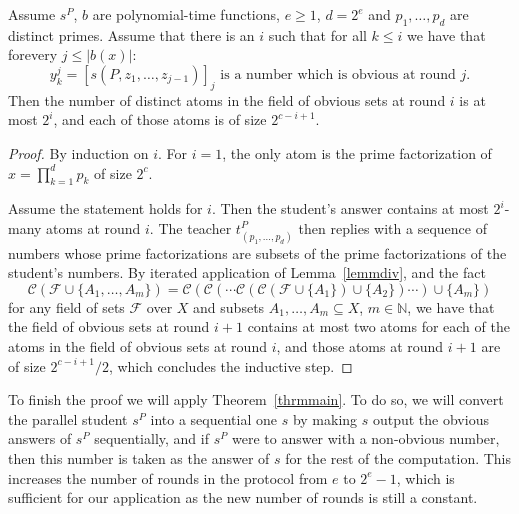 \documentclass{lmcs}
\newcommand{\abs}[1]{\lvert #1\rvert}
\newcommand{\F}{\mathcal{F}}
\newcommand{\C}{\mathcal{C}}
\newcommand{\NN}{\mathbb{N}}
\begin{document}
\begin{lem}\label{lemmatoms}
    Assume $s^P$, $b$ are polynomial-time functions, ${e}\geq 1$, $d=2^{{e}}$ and $p_1,\dots,p_d$ are distinct primes. Assume that there is an $i$ such that for all $k\leq i$ we have that for\linebreak every $j\leq \abs{b(x)}$: 
    \[y_k^j=[s(P,z_1,\dots,z_{j-1})]_j\text{ is a number which is obvious at round $j$.}\] 
    Then the number of distinct atoms in the field of obvious sets at round $i$ is at most $2^i$, and each of those atoms is of size $2^{c-i+1}$.
\end{lem}
\begin{proof}
    By induction on $i$. For $i=1$, the only atom is the prime factorization of $x=\prod^d_{k=1} p_k$ of size $2^{c}$.

    Assume the statement holds for $i$. Then the student's answer contains at most $2^i$-many atoms at round $i$. The teacher $t^P_{(p_1,\dots,p_d)}$ then replies with a sequence of numbers whose prime factorizations are subsets of the prime factorizations of the student's numbers. By iterated application of Lemma~\ref{lemmdiv}, and the fact 
    \[\C(\F \cup \{A_1,\dots,A_m\})=\C(\C(\cdots \C(\C(\F \cup \{A_1\})\cup \{A_2\}) \cdots )\cup \{A_m\})\]
    for any field of sets $\F$ over $X$ and subsets $A_1,\dots,A_m \subseteq X$, $m\in \NN$, we have that the field of obvious sets at round $i+1$ contains at most two atoms for each of the atoms in the field of obvious sets at round $i$, and those atoms at round $i+1$ are of size $2^{c-i+1}/2$, which concludes the inductive step.
\end{proof}

To finish the proof we will apply Theorem~\ref{thrmmain}. To do so, we will convert the parallel student $s^P$ into a sequential one $s$ by making $s$ output the obvious answers of $s^P$ sequentially, and if $s^P$ were to answer with a non-obvious number, then this number is taken as the answer of $s$ for the rest of the computation. This increases the number of rounds in the protocol from ${e}$ to $2^{{e}}-1$, which is sufficient for our application as the new number of rounds is still a constant.
\end{document}
